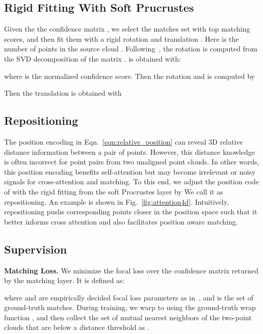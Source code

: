 \subsection{Rigid Fitting With Soft Prucrustes}\label{sec:prucrustes}
Given the the confidence matrix , we select the matches set  with top  matching scores, and then fit them with a rigid rotation  and translation  .  Here  is the number of points in the source cloud .
Following~\cite{arun1987procrustes}, the rotation is computed from the SVD decomposition of the matrix .   is obtained with:  

where  is the normalized confidence score. Then the rotation and is computed by
 
Then the translation is obtained with 



\subsection{Repositioning}\label{sec:Repositioning}
The position encoding in Eqn.~\ref{eqn:relative_position} can reveal 3D relative distance information between a pair of points.
However, this distance knowledge is often incorrect for point pairs from two unaligned point clouds.
In other words, this position encoding benefits self-attention but may become irrelevant or noisy signals for cross-attention and matching.
To this end, we adjust the position code  of  with the rigid fitting  from the soft Procrustes layer by
We call it as repositioning. An example is shown in Fig.~\ref{fig:attention4d}.
Intuitively, repositioning pushs corresponding points closer in the position space such that it better informs cross attention and also facilitates position aware matching.

\subsection{Supervision}\label{sec:Supervision}


\medskip
\noindent
\textbf{Matching Loss.}
We minimize the focal loss over the confidence matrix  returned by the matching layer. 
It is defined as:

where  and  are empirically decided focal loss parameters as in~\cite{focal_loss}, and  is the set of ground-truth matches.
During training, we warp  to  using the ground-truth wrap function , and then collect the set of mutual nearest neighbors of the two-point clouds that are below a distance threshold as . 


